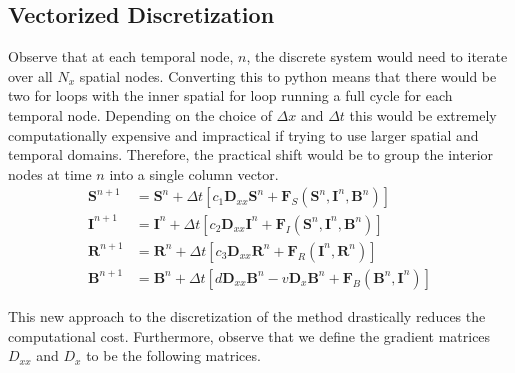 


\subsection{Vectorized Discretization}

Observe that at each temporal node, $n$, the discrete system would need to iterate over all $N_x$ spatial nodes. Converting this to python means that there would be two for loops with the inner spatial for loop running a full cycle for each temporal node. Depending on the choice of $\Delta x$ and $\Delta t$ this would be extremely computationally expensive and impractical if trying to use larger spatial and temporal domains. Therefore, the practical shift would be to group the interior nodes at time $n$ into a single column vector. 
\begin{align}
    \mathbf{S}^{n+1} &= \mathbf{S}^n + \Delta t \left[ c_1 \mathbf{D}_{xx} \mathbf{S}^n + \mathbf{F}_S(\mathbf{S}^n, \mathbf{I}^n, \mathbf{B}^n) \right] \\[8pt]
    \mathbf{I}^{n+1} &= \mathbf{I}^n + \Delta t \left[ c_2 \mathbf{D}_{xx} \mathbf{I}^n + \mathbf{F}_I(\mathbf{S}^n, \mathbf{I}^n, \mathbf{B}^n) \right] \\[8pt]
    \mathbf{R}^{n+1} &= \mathbf{R}^n + \Delta t \left[ c_3 \mathbf{D}_{xx} \mathbf{R}^n + \mathbf{F}_R(\mathbf{I}^n, \mathbf{R}^n) \right] \\[8pt]
    \mathbf{B}^{n+1} &= \mathbf{B}^n + \Delta t \left[ d \mathbf{D}_{xx} \mathbf{B}^n - v \mathbf{D}_x \mathbf{B}^n + \mathbf{F}_B(\mathbf{B}^n, \mathbf{I}^n) \right]
\end{align}

This new approach to the discretization of the method drastically reduces the computational cost. Furthermore, observe that we define the gradient matrices $D_{xx}$ and $D_x$ to be the following matrices. 

